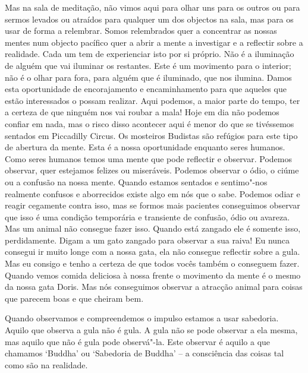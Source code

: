 Mas na sala de meditação, não vimos aqui para olhar uns para os outros
ou para sermos levados ou atraídos para qualquer um dos objectos na
sala, mas para os usar de forma a relembrar. Somos relembrados quer a
concentrar as nossas mentes num objecto pacífico quer a abrir a mente a
investigar e a reflectir sobre a realidade. Cada um tem de experienciar
isto por si próprio. Não é a iluminação de alguém que vai iluminar os
restantes. Este é um movimento para o interior; não é o olhar para fora,
para alguém que é iluminado, que nos ilumina. Damos esta oportunidade de
encorajamento e encaminhamento para que aqueles que estão interessados o
possam realizar. Aqui podemos, a maior parte do tempo, ter a certeza de
que ninguém
nos vai roubar a mala! Hoje em dia não podemos confiar em
nada, mas o risco disso acontecer aqui é menor do que se tivéssemos
sentados em Piccadilly Circus. Os mosteiros Budistas são refúgios para
este tipo de abertura da mente. Esta é a nossa oportunidade enquanto
seres humanos. Como seres humanos temos uma mente que pode reflectir e
observar. Podemos observar, quer estejamos felizes ou miseráveis.
Podemos observar o ódio, o ciúme ou a confusão na nossa mente. Quando
estamos sentados e sentimo"-nos realmente confusos e aborrecidos existe
algo em nós que o sabe. Podemos odiar e reagir cegamente contra isso,
mas se formos mais pacientes conseguimos observar que isso é uma
condição temporária e transiente de confusão, ódio ou avareza. Mas um
animal não consegue fazer isso. Quando está zangado ele é somente isso,
perdidamente. Digam a um gato zangado para observar a sua raiva! Eu
nunca consegui ir muito longe com a nossa gata, ela não consegue
reflectir sobre a gula. Mas eu consigo e tenho a certeza de que todos
vocês também o conseguem fazer. Quando vemos comida deliciosa à nossa
frente o movimento da mente é o mesmo da nossa gata Doris. Mas nós
conseguimos observar a atracção animal para coisas que parecem boas e
que cheiram bem.

Quando observamos e compreendemos o impulso estamos a usar sabedoria.
Aquilo que observa a gula não é gula. A gula não se pode observar a ela
mesma, mas aquilo que não é gula pode observá"-la. Este observar é aquilo
a que chamamos `Buddha' ou
`Sabedoria de Buddha' -- a consciência das coisas tal como são na
realidade.
